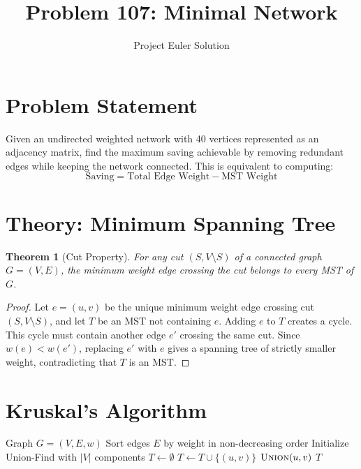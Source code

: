 \documentclass[12pt,a4paper]{article}
\title{Problem 107: Minimal Network}
\author{Project Euler Solution}
\date{}
\newtheorem{theorem}{Theorem}
\theoremstyle{definition}
\begin{document}
\maketitle

\section{Problem Statement}

Given an undirected weighted network with 40 vertices represented as an adjacency matrix, find the maximum saving achievable by removing redundant edges while keeping the network connected. This is equivalent to computing:
\[
\text{Saving} = \text{Total Edge Weight} - \text{MST Weight}
\]

\section{Theory: Minimum Spanning Tree}

\begin{theorem}[Cut Property]
For any cut $(S, V \setminus S)$ of a connected graph $G = (V, E)$, the minimum weight edge crossing the cut belongs to every MST of $G$.
\end{theorem}

\begin{proof}
Let $e = (u,v)$ be the unique minimum weight edge crossing cut $(S, V \setminus S)$, and let $T$ be an MST not containing $e$. Adding $e$ to $T$ creates a cycle. This cycle must contain another edge $e'$ crossing the same cut. Since $w(e) < w(e')$, replacing $e'$ with $e$ gives a spanning tree of strictly smaller weight, contradicting that $T$ is an MST.
\end{proof}

\section{Kruskal's Algorithm}

\begin{algorithm}[H]
\caption{Kruskal's MST Algorithm}
\begin{algorithmic}[1]
\REQUIRE Graph $G = (V, E, w)$
\STATE Sort edges $E$ by weight in non-decreasing order
\STATE Initialize Union-Find with $|V|$ components
\STATE $T \leftarrow \emptyset$
        \STATE $T \leftarrow T \cup \{(u, v)\}$
        \STATE $\textsc{Union}(u, v)$
    \ENDIF
\ENDFOR
\RETURN $T$
\end{algorithmic}
\end{algorithm}
\end{document}
